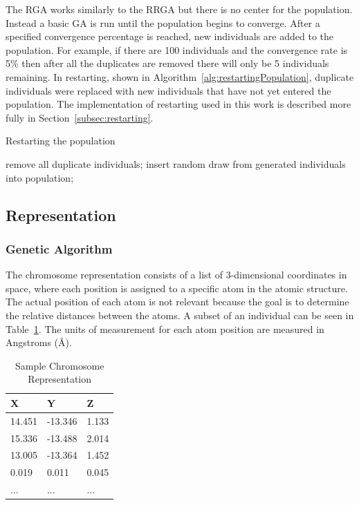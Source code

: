\documentclass[conference]{IEEEtran}
\begin{document}
The RGA works similarly to the RRGA but there is no center for the population. Instead a basic GA is run until the population begins to converge. After a specified convergence percentage is reached, new individuals are added to the population. For example, if there are 100 individuals and the convergence rate is 5\% then after all the duplicates are removed there will only be 5 individuals remaining. In restarting, shown in Algorithm~\ref{alg:restartingPopulation}, duplicate individuals were replaced with new individuals that have not yet entered the population. The implementation of restarting used in this work is described more fully in Section~\ref{subsec:restarting}.

\begin{algorithm}
\caption{Restarting the population}
\label{alg:restartingPopulation}
\begin{algorithmic}

  \STATE remove all duplicate individuals;
    \STATE insert random draw from generated individuals into population;
  \ENDWHILE
\ENDIF

\end{algorithmic}
\end{algorithm}

\subsection{Representation}

\subsubsection{Genetic Algorithm}

The chromosome representation consists of a list of 3-dimensional coordinates in space, where each position is assigned to a specific atom in the atomic structure. The actual position of each atom is not relevant because the goal is to determine the relative distances between the atoms. A subset of an individual can be seen in Table~\ref{table:sampleChromosome}. The units of measurement for each atom position are measured in Angstroms (\AA).

\begin{table}
\caption{Sample Chromosome Representation}
\label{table:sampleChromosome}
\centering
\normalsize
\begin{tabular}{ | l | l | l |}
  \hline
    X & Y & Z \\ \hline
    14.451 & -13.346 & 1.133 \\ \hline
    15.336 & -13.488 & 2.014 \\ \hline
    13.005 & -13.364 & 1.452 \\ \hline
    0.019 & 0.011 & 0.045 \\ \hline
    ... & ... & ... \\ \hline
\end{tabular}
\end{table}
\end{document}
